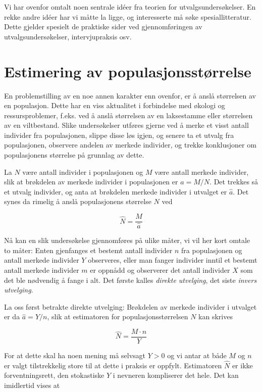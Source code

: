 Vi har ovenfor omtalt noen sentrale id\'{e}er fra teorien for 
utvalgsundersøkelser.  En rekke andre id\'{e}er har vi måtte la ligge,
og interesserte må søke spesiallitteratur.  Dette gjelder spesielt
de praktiske sider ved gjennomføringen av utvalgsundersøkelser,
intervjupraksis osv.


\section{Estimering av populasjonsstørrelse}

En problemstilling av en noe annen karakter enn ovenfor, er å anslå
størrelsen av en populasjon.  Dette har en viss aktualitet
 i forbindelse med økologi og ressursproblemer,
f.eks. ved å anslå størrelsen av en laksestamme eller størrelsen
av en viltbestand.  Slike undersøkelser utføres gjerne ved å merke
et visst antall individer fra populasjonen, slippe disse løs igjen, og 
senere ta et utvalg fra populasjonen, observere andelen av merkede individer,
og trekke konklusjoner om populasjonens størrelse på grunnlag av dette.

La $N$ være antall individer i populasjonen og $M$ være antall 
merkede individer, slik at brøkdelen av merkede individer i populasjonen
er $a = M/N$.  Det trekkes så et utvalg individer, og anta at 
brøkdelen merkede individer i utvalget er $\hat{a}$.  Det synes da rimelig
å anslå populasjonens størrelse $N$ ved

\[    \hat{N} = \frac{M}{\hat{a}}     \]

\noindent Nå kan en slik undersøkelse gjennomføres på ulike
måter, vi vil her kort omtale to måter:  Enten gjenfanges et bestemt
antall individer $n$ fra populasjonen og antall merkede individer $Y$ observeres,
eller man fanger individer inntil et bestemt antall merkede individer $m$
er oppnådd og observerer det antall individer $X$ som det ble nødvendig
å fange i alt.  Det første kalles {\em direkte utvelging}, det siste
{\em invers utvelging}.

La oss først betrakte direkte utvelging:  Brøkdelen av merkede 
individer i utvalget er da $\hat{a} = Y/n$, slik at estimatoren for
populasjonsstørrelsen $N$ kan skrives

\[    \hat{N} = \frac{M \cdot n}{Y}     \]

\noindent For at dette skal ha noen mening må selvsagt $Y>0$ og vi antar
at både $M$ og $n$ er valgt tilstrekkelig store til at dette i praksis er
oppfylt. Estimatoren $\hat{N}$ er ikke forventningsrett, den stokastiske $Y$ i 
nevneren kompliserer det hele.  Det kan imidlertid vises at 

